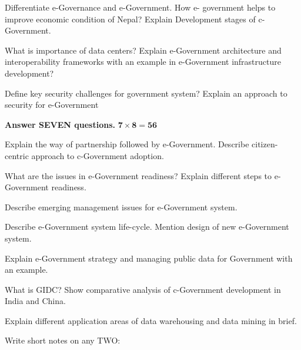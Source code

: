\documentclass[a4paper, twoside, 12pt, noanswers]{exam}
\begin{document}
\begin{questions}

	\question[2+4+6] Differentiate e-Governance and e-Government. How e-
	government helps to improve economic condition of Nepal?
	Explain Development stages of c-Government.

	\question[3+9] What is importance of data centers? Explain e-Government
	architecture and interoperability frameworks with an example in
	e-Government infrastructure development?

	\question[6+6] Define key security challenges for government system? Explain an approach to security for e-Government

	

{\par}
{\hspace*{-0.5cm}\noindent\bfseries Answer SEVEN questions.} \hfill {\( \mathbf{7 \times 8 = 56}\)}

\question[2+6] Explain the way of partnership followed by e-Government. Describe citizen-centric approach to c-Government adoption.

\question[2+6] What are the issues in e-Government readiness? Explain different steps to e-Government readiness.

\question[8] Describe emerging management issues for e-Government system. 

\question[4+4]  Describe e-Government system life-cycle. Mention design of new
e-Government system.

\question[2+6] Explain e-Government strategy and managing public data for
Government with an example.

\question[2+6] What is GIDC? Show comparative analysis of c-Government
development in India and China.

\question[8] Explain different application areas of data warehousing and data
mining in brief.

\question[4+4] Write short notes on any TWO:
\newpage
\end{questions}
\end{document}
